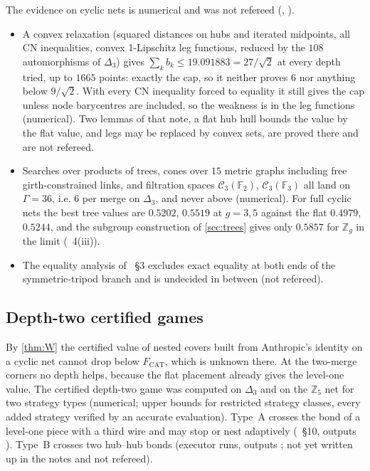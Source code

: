 \documentclass[10pt]{amsart}
\theoremstyle{plain}
\theoremstyle{definition}
\theoremstyle{remark}
\numberwithin{equation}{section}
\newcommand{\F}{\mathbb{F}}
\newcommand{\Z}{\mathbb{Z}}
\newcommand{\cC}{\mathcal{C}}
\newcommand{\Fcat}{F_{\mathrm{CAT}}}
\newcommand{\stN}{numerical}
\newcommand{\stU}{not refereed}
\begin{document}
The evidence on cyclic nets is numerical and was not refereed (,
).
\begin{itemize}
\item A convex relaxation (squared distances on hubs and iterated midpoints, all CN inequalities, convex
1-Lipschitz leg functions, reduced by the $108$ automorphisms of $\Delta_3$) gives $\sum_kb_k\le19.091883
=27/\sqrt2$ at every depth tried, up to $1665$ points: exactly the cap, so it neither proves $6$ nor anything
below $9/\sqrt2$. With every CN inequality forced to equality it still gives the cap unless node barycentres
are included, so the weakness is in the leg functions (\stN). Two lemmas of that note, a flat hub hull
bounds the value by the flat value, and legs may be replaced by convex sets, are proved there and are \stU.
\item Searches over products of trees, cones over $15$ metric graphs including free girth-constrained links,
and filtration spaces $\cC_3(\F_2)$, $\cC_3(\F_3)$ all land on $\Gamma=36$, i.e. $6$ per merge on $\Delta_3$, and
never above (\stN). For full cyclic nets the best tree values are $0.5202$, $0.5519$ at $g=3,5$ against the
flat $0.4979$, $0.5244$, and the subgroup construction of \cref{sec:trees} gives only $0.5857$ for $\Z_g$ in
the limit (~4(iii)).
\item The equality analysis of ~\S3 excludes exact equality at both ends of the
symmetric-tripod branch and is undecided in between (\stU).
\end{itemize}

\subsection{Depth-two certified games}
By \cref{thm:W} the certified value of nested covers built from Anthropic's identity on a cyclic net cannot
drop below $\Fcat$, which is unknown there. At the two-merge corners no depth helps, because the flat placement already gives the level-one
value. The certified depth-two game was computed on $\Delta_3$ and on the $\Z_5$ net for two strategy types
(\stN; upper bounds for restricted strategy classes, every added strategy verified by an accurate evaluation).
Type~A crosses the bond of a level-one piece with a third wire and may stop or nest adaptively
(~\S10, outputs ). Type~B crosses two hub--hub bonds (executor runs,
outputs ; not yet written up in the notes and not refereed).
\end{document}
